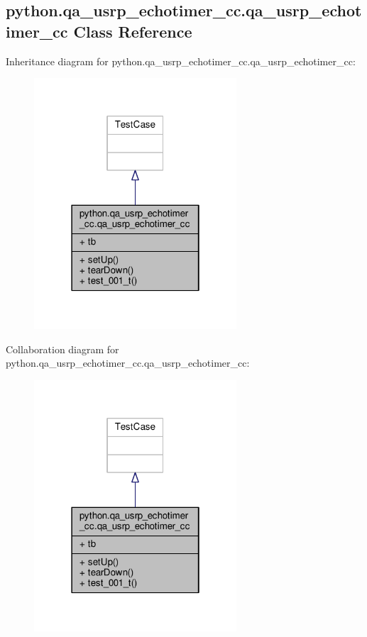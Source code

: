 \subsection{python.\+qa\+\_\+usrp\+\_\+echotimer\+\_\+cc.\+qa\+\_\+usrp\+\_\+echotimer\+\_\+cc Class Reference}
\label{classpython_1_1qa__usrp__echotimer__cc_1_1qa__usrp__echotimer__cc}


Inheritance diagram for python.\+qa\+\_\+usrp\+\_\+echotimer\+\_\+cc.\+qa\+\_\+usrp\+\_\+echotimer\+\_\+cc\+:
\nopagebreak
\begin{figure}[H]
\begin{center}
\leavevmode
\includegraphics[width=214pt]{d2/d65/classpython_1_1qa__usrp__echotimer__cc_1_1qa__usrp__echotimer__cc__inherit__graph}
\end{center}
\end{figure}


Collaboration diagram for python.\+qa\+\_\+usrp\+\_\+echotimer\+\_\+cc.\+qa\+\_\+usrp\+\_\+echotimer\+\_\+cc\+:
\nopagebreak
\begin{figure}[H]
\begin{center}
\leavevmode
\includegraphics[width=214pt]{da/d29/classpython_1_1qa__usrp__echotimer__cc_1_1qa__usrp__echotimer__cc__coll__graph}
\end{center}
\end{figure}
